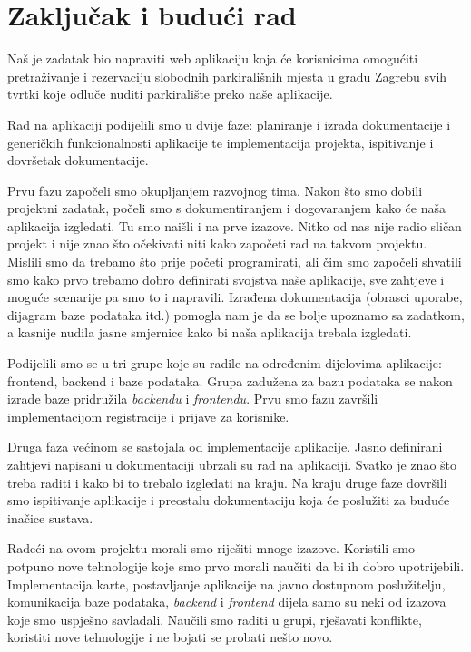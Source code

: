 \chapter{Zaključak i budući rad}
		
		Naš je zadatak bio napraviti web aplikaciju koja će korisnicima omogućiti pretraživanje i rezervaciju slobodnih parkirališnih mjesta u gradu Zagrebu svih tvrtki koje odluče nuditi parkiralište preko naše aplikacije. 
		
		Rad na aplikaciji podijelili smo u dvije faze: planiranje i izrada dokumentacije i generičkih funkcionalnosti aplikacije te implementacija projekta, ispitivanje i dovršetak dokumentacije.
		
		Prvu fazu započeli smo okupljanjem razvojnog tima. Nakon što smo dobili projektni zadatak, počeli smo s dokumentiranjem i dogovaranjem kako će naša aplikacija izgledati. Tu smo naišli i na prve izazove. Nitko od nas nije radio sličan projekt i nije znao što očekivati niti kako započeti rad na takvom projektu. Mislili smo da trebamo što prije početi programirati, ali čim smo započeli shvatili smo kako prvo trebamo dobro definirati svojstva naše aplikacije, sve zahtjeve i moguće scenarije pa smo to i napravili. Izrađena dokumentacija (obrasci uporabe, dijagram baze podataka itd.) pomogla nam je da se bolje upoznamo sa zadatkom, a kasnije nudila jasne smjernice kako bi naša aplikacija trebala izgledati.
		
		Podijelili smo se u tri grupe koje su radile na određenim dijelovima aplikacije: frontend, backend i baze podataka. Grupa zadužena za bazu podataka se nakon izrade baze pridružila \textit{backendu} i \textit{frontendu}. Prvu smo fazu završili implementacijom registracije i prijave za korisnike.
		
		Druga faza većinom se sastojala od implementacije aplikacije. Jasno definirani zahtjevi napisani u dokumentaciji ubrzali su rad na aplikaciji. Svatko je znao što treba raditi i kako bi to trebalo izgledati na kraju. Na kraju druge faze dovršili smo ispitivanje aplikacije i preostalu dokumentaciju koja će poslužiti za buduće inačice sustava.
		
		Radeći na ovom projektu morali smo riješiti mnoge izazove. Koristili smo potpuno nove tehnologije koje smo prvo morali naučiti da bi ih dobro upotrijebili. Implementacija karte, postavljanje aplikacije na javno dostupnom poslužitelju, komunikacija baze podataka, \textit{backend} i \textit{frontend} dijela samo su neki od izazova koje smo uspješno savladali. Naučili smo raditi u grupi, rješavati konflikte, koristiti nove tehnologije i ne bojati se probati nešto novo. 
		
